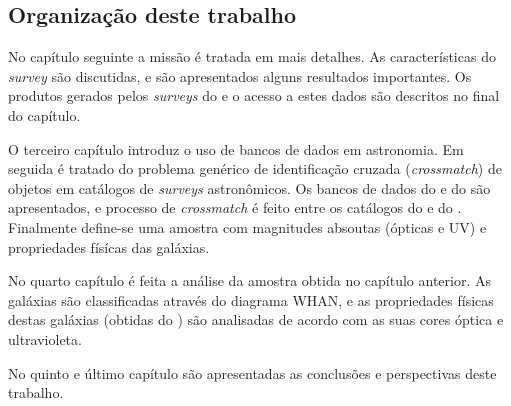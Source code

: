 \subsection{Organização deste trabalho}

No capítulo seguinte a missão \galex é tratada em mais detalhes. As
características do {\em survey} são discutidas, e são apresentados alguns
resultados importantes. Os produtos gerados pelos {\em surveys} do \galex e o
acesso a estes dados são descritos no final do capítulo.

O terceiro capítulo introduz o uso de bancos de dados em astronomia. Em seguida
é tratado do problema genérico de identificação cruzada ({\em crossmatch}) de
objetos em catálogos de {\em surveys} astronômicos. Os bancos de dados do \SDSS
e do \starlight são apresentados, e processo de {\em crossmatch} é feito entre
os catálogos do \SDSS e do \galex. Finalmente define-se uma amostra com
magnitudes absoutas (ópticas e UV) e propriedades físícas das galáxias.

No quarto capítulo é feita a análise da amostra obtida no capítulo anterior. As
galáxias são classificadas através do diagrama WHAN, e as propriedades físicas
destas galáxias (obtidas do \starlight) são analisadas de acordo com as suas
cores óptica e ultravioleta.

No quinto e último capítulo são apresentadas as conclusões e perspectivas deste
trabalho.

